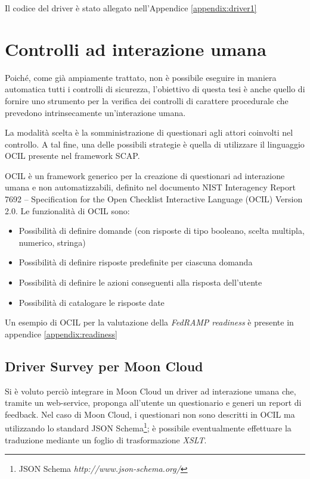 \documentclass[../main.tex]{subfiles}
\begin{document}
Il codice del driver è stato allegato nell'Appendice \ref{appendix:driver1}

\section{Controlli ad interazione umana}
Poiché, come già ampiamente trattato, non è possibile eseguire in maniera automatica tutti i controlli di sicurezza, l'obiettivo di questa tesi è
anche quello di fornire uno strumento per la verifica dei controlli di carattere procedurale che prevedono intrinsecamente un'interazione umana.

La modalità scelta è la somministrazione di questionari agli attori coinvolti nel controllo. A tal fine, una delle possibili strategie è quella di utilizzare
il linguaggio OCIL presente nel framework SCAP.

OCIL è un framework generico per la creazione di questionari ad interazione umana e non automatizzabili, definito nel documento NIST Interagency Report 7692 – Specification for the Open Checklist Interactive Language (OCIL) Version 2.0.
Le funzionalità di OCIL sono:
\begin{itemize}
    \item Possibilità di definire domande (con risposte di tipo booleano, scelta multipla, numerico, stringa)
    \item Possibilità di definire risposte predefinite per ciascuna domanda
    \item Possibilità di definire le azioni conseguenti alla risposta dell'utente 
    \item Possibilità di catalogare le risposte date
\end{itemize}
Un esempio di OCIL per la valutazione della \textit{FedRAMP readiness} è presente in appendice \ref{appendix:readiness}

\subsection{Driver Survey per Moon Cloud}
\label{subsec:surveymooncloud}
Si è voluto perciò integrare in Moon Cloud un driver ad interazione umana che, tramite un web-service, proponga all'utente un questionario e generi un report di feedback.
Nel caso di Moon Cloud, i questionari non sono descritti in OCIL ma utilizzando lo standard JSON Schema\footnote{JSON Schema \textit{http://www.json-schema.org/}}; è possibile eventualmente effettuare la traduzione mediante un foglio di trasformazione \textit{XSLT}.
\end{document}
